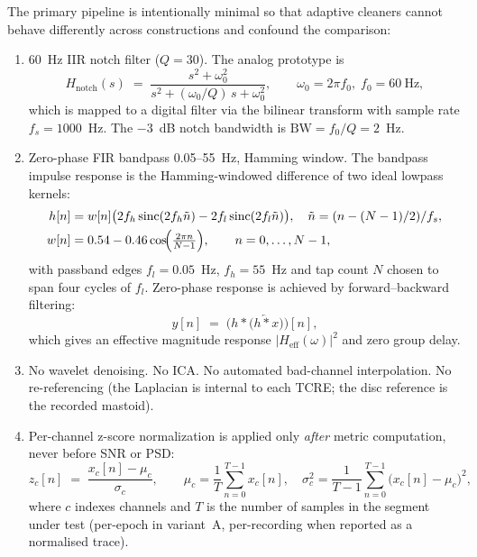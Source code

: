 \documentclass[10pt,a4paper]{article}
\begin{document}
The primary pipeline is intentionally minimal so that adaptive cleaners cannot behave differently across constructions and confound the comparison:

\begin{enumerate}[label=(\alph*)]
\item 60~Hz IIR notch filter ($Q=30$). The analog prototype is
  \begin{equation}
  H_{\mathrm{notch}}(s) \;=\; \frac{s^{2} + \omega_{0}^{2}}{s^{2} + (\omega_{0}/Q)\,s + \omega_{0}^{2}},
  \qquad \omega_{0} = 2\pi f_{0},\; f_{0}=60~\mathrm{Hz},
  \label{eq:notch}
  \end{equation}
  which is mapped to a digital filter via the bilinear transform with sample rate $f_{s}=1000$~Hz. The $-3$~dB notch bandwidth is $\mathrm{BW} = f_{0}/Q = 2$~Hz.

 \item Zero-phase FIR bandpass 0.05--55~Hz, Hamming window. The bandpass impulse response is the Hamming-windowed difference of two ideal lowpass kernels:
  \begin{align}
  h[n] &= w[n]\bigl(2 f_{h}\,\mathrm{sinc}(2 f_{h} \tilde{n}) - 2 f_{l}\,\mathrm{sinc}(2 f_{l} \tilde{n})\bigr),
  \quad \tilde{n} = (n - (N-1)/2)/f_{s},\nonumber\\
  w[n] &= 0.54 - 0.46\cos\!\Bigl(\tfrac{2\pi n}{N-1}\Bigr),\qquad n = 0,\ldots,N-1,
  \label{eq:fir}
  \end{align}
  with passband edges $f_{l}=0.05$~Hz, $f_{h}=55$~Hz and tap count $N$ chosen to span four cycles of $f_{l}$. Zero-phase response is achieved by forward--backward filtering:
  \begin{equation}
  y[n] \;=\; \bigl(h \ast \bigl(\overleftarrow{h \ast x}\bigr)\bigr)[n],
  \label{eq:filtfilt}
  \end{equation}
  which gives an effective magnitude response $|H_{\mathrm{eff}}(\omega)|^{2}$ and zero group delay.

\item No wavelet denoising. No ICA. No automated bad-channel interpolation. No re-referencing (the Laplacian is internal to each TCRE; the disc reference is the recorded mastoid).
\item Per-channel z-score normalization is applied only \emph{after} metric computation, never before SNR or PSD:
  \begin{equation}
  z_{c}[n] \;=\; \frac{x_{c}[n] - \mu_{c}}{\sigma_{c}},
  \qquad
  \mu_{c} = \frac{1}{T}\sum_{n=0}^{T-1} x_{c}[n],\quad
  \sigma_{c}^{2} = \frac{1}{T-1}\sum_{n=0}^{T-1}\bigl(x_{c}[n]-\mu_{c}\bigr)^{2},
  \label{eq:zscore}
  \end{equation}
  where $c$ indexes channels and $T$ is the number of samples in the segment under test (per-epoch in variant~A, per-recording when reported as a normalised trace).
\end{enumerate}
\end{document}
